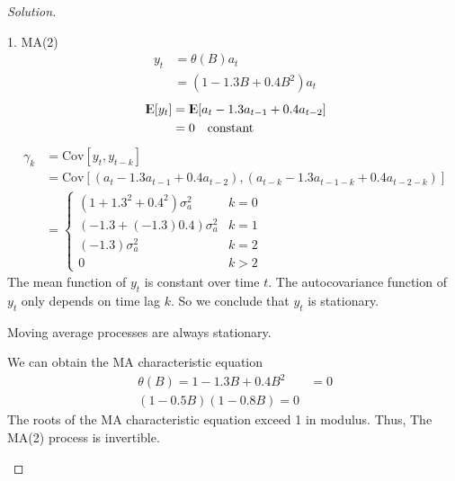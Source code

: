 \documentclass[UTF8,a4paper,14pt]{ctexart}
\newcommand{\E}{{\rm I\kern-.3em E}}
\newcommand{\Cov}{\mathrm{Cov}}
\newenvironment{solution}
  {\renewcommand\qedsymbol{$\blacksquare$}\begin{proof}[Solution]}
  {\end{proof}}
\theoremstyle{definition}
\theoremstyle{remark}
\begin{document}
\begin{solution}
\begin{mybox}{1. MA(2)}
    \begin{equation}\
      \begin{aligned}
      y_t &=  \theta(B)a_t \\    
      &=(1- 1.3 B +0.4 B^2 )a_t
      \end{aligned}
    \end{equation}
    \begin{equation}\
      \begin{aligned}
      \E[y_t]   
      &=\E[a_{t} - 1.3 a_{t-1} + 0.4 a_{t-2}]\\
      &=0\quad\text{constant}
      \end{aligned}
    \end{equation}
    \begin{equation}\
      \begin{aligned}
        \gamma_k &= \Cov[y_t,y_{t-k}]\\
        & = \Cov[(a_{t} - 1.3 a_{t-1} + 0.4 a_{t-2}) , (a_{t-k} - 1.3 a_{t-1-k} + 0.4 a_{t-2-k})]\\
        &=\begin{cases}
          (1+1.3^2+0.4^2)\sigma_a^2 & k = 0\\
          (-1.3+(-1.3)0.4)\sigma_a^2 & k = 1\\
          (-1.3)\sigma_a^2 & k = 2\\
          0 & k>2
        \end{cases}
      \end{aligned}
    \end{equation}
    The mean function of \({y_t}\) is constant over time \(t\). The autocovariance function of \({y_t}\) only depends on time lag \(k\). So we conclude that \({y_t}\) is stationary.  

    Moving average processes are always stationary.
    
    
    We can obtain the MA characteristic equation 
    \begin{equation}\
      \begin{aligned}
       \theta(B) = 1-1.3 B +0.4 B^2 &= 0\\
       (1-0.5B)(1-0.8B) = 0
      \end{aligned}
    \end{equation}
    The roots of the MA characteristic equation exceed 1 in modulus. Thus, The MA(2) process is invertible.


\end{mybox}
\end{solution}
\end{document}
